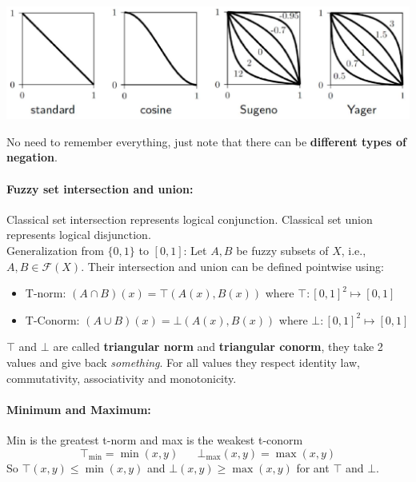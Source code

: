 \begin{center}
	\includegraphics[width=0.95\columnwidth]{img/FS/famneg}
\end{center}

No need to remember everything, just note that there can be \textbf{different types of negation}.\\

\newpage

\paragraph{Fuzzy set intersection and union:} Classical set intersection represents logical conjunction. Classical set union represents logical disjunction. \\

Generalization from $\{0,1\}$ to $[0,1]$: Let $A, B$ be fuzzy subsets of $X$, i.e., $A,B \in \mathcal{F} (X)$. Their intersection and union can be defined pointwise using: 
\begin{itemize}[label*=]
	\item T-norm: $(A \cap B) (x) = \top (A(x), B(x))$ where $\top : [0,1]^2 \mapsto [0,1]$
	\item T-Conorm: $(A \cup B) (x) = \bot (A(x), B(x))$ where $\bot : [0,1]^2 \mapsto [0,1]$
\end{itemize}

$\top$ and $\bot$ are called \textbf{triangular norm} and \textbf{triangular conorm}, they take 2 values and give back \textit{something}. For all values they respect identity law, commutativity, associativity and monotonicity. \\

\paragraph{Minimum and Maximum:} Min is the greatest t-norm and max is the weakest t-conorm
$$ \top_{\min} = \min (x, y) \;\;\;\;\;\; \bot_{\max} (x,y) = \max (x, y)$$
So $\top (x,y) \leq \min (x,y)$ and $\bot (x,y) \geq \max (x,y)$ for ant $\top$ and $\bot$.\\

